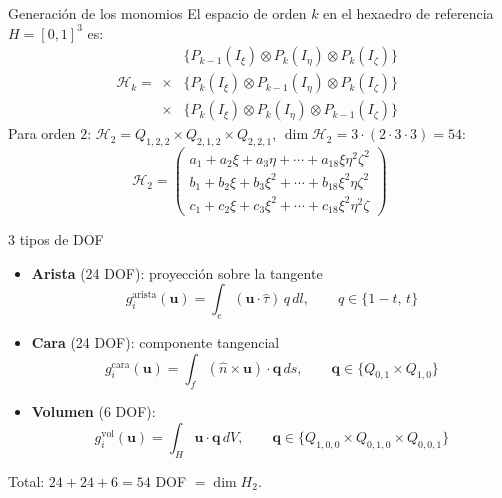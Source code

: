 \documentclass{beamer}
\begin{document}
\begin{frame}{Generación de los monomios}
  El espacio de orden $k$ en el hexaedro de referencia $H=[0,1]^3$ es:
  \[
    \mathcal{H}_k =
    \begin{aligned}
      &\{P_{k-1}(I_\xi)\otimes P_k(I_\eta)\otimes P_k(I_\zeta)\}\\
      \times{}&\{P_k(I_\xi)\otimes P_{k-1}(I_\eta)\otimes P_k(I_\zeta)\}\\
      \times{}&\{P_k(I_\xi)\otimes P_k(I_\eta)\otimes P_{k-1}(I_\zeta)\}
    \end{aligned}
  \]
  Para orden $2$: $\mathcal{H}_2 = Q_{1,2,2} \times Q_{2,1,2} \times Q_{2,2,1}$,
  $\dim \mathcal{H}_2 = 3 \cdot (2\cdot3\cdot3) = 54$:
  \[
    \mathcal{H}_2 = \begin{pmatrix}
      a_1 + a_2\xi + a_3\eta + \cdots + a_{18}\xi\eta^2\zeta^2 \\
      b_1 + b_2\xi + b_3\xi^2 + \cdots + b_{18}\xi^2\eta\zeta^2 \\
      c_1 + c_2\xi + c_3\xi^2 + \cdots + c_{18}\xi^2\eta^2\zeta
    \end{pmatrix}
  \]
\end{frame}

\begin{frame}{3 tipos de DOF}
  \begin{itemize}
    \item \textbf{Arista} (24 DOF): proyección sobre la tangente
      \[
        g_i^{\text{arista}}(\mathbf{u}) = \int_e (\mathbf{u} \cdot \hat{\tau})\,q\,dl,
        \qquad q \in \{1-t,\, t\}
      \]
    \item \textbf{Cara} (24 DOF): componente tangencial
      \[
        g_i^{\text{cara}}(\mathbf{u}) = \int_f (\hat{n} \times \mathbf{u}) \cdot \mathbf{q}\,ds,
        \qquad \mathbf{q} \in \{Q_{0,1} \times Q_{1,0}\}
      \]
    \item \textbf{Volumen} (6 DOF):
      \[
        g_i^{\text{vol}}(\mathbf{u}) = \int_H \mathbf{u} \cdot \mathbf{q}\,dV,
        \qquad \mathbf{q} \in \{Q_{1,0,0} \times Q_{0,1,0} \times Q_{0,0,1}\}
      \]
  \end{itemize}
  Total: $24 + 24 + 6 = 54$ DOF $= \dim H_2$.
\end{frame}
\end{document}
